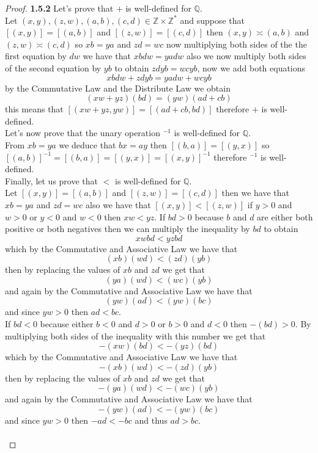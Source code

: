 \documentclass[11pt]{article}
\newcommand{\Z}{\mathbb{Z}}
\newcommand{\Q}{\mathbb{Q}}
\theoremstyle{definition}
\begin{document}
    \begin{proof}{\textbf{1.5.2}}
        Let's prove that $+$ is well-defined for $\Q$.\\
        Let $(x,y),(z,w),(a,b),(c,d) \in \Z \times \Z^*$ and suppose that $[(x,y)] = [(a,b)]$
        and $[(z,w)]=[(c,d)]$ then $(x,y)\asymp(a,b)$ and $(z,w)\asymp(c,d)$ so $xb=ya$
        and $zd=wc$ now multiplying both sides of the the first equation by $dw$ we have
        that $xbdw=yadw$ also we now multiply both sides of the second equation by $yb$
        to obtain $zdyb=wcyb$, now we add both equations
        $$xbdw+zdyb=yadw+wcyb$$
        by the Commutative Law and the Distribute Law we obtain
        $$(xw+yz)(bd)=(yw)(ad+cb)$$
        this means that $[(xw+yz,yw)]=[(ad+cb, bd)]$ therefore $+$ is well-defined.\\
        Let's now prove that the unary operation $^{-1}$ is well-defined for $\Q$.\\
        From $xb=ya$ we deduce that $bx=ay$ then $[(b,a)]=[(y,x)]$ so
        $[(a,b)]^{-1}=[(b,a)]=[(y,x)]=[(x,y)]^{-1}$ therefore $^{-1}$ is well-defined.\\
        Finally, let us prove that $<$ is well-defined for $\Q$.\\
        Let $[(x,y)]=[(a,b)]$ and $[(z,w)]=[(c,d)]$ then we have that $xb=ya$ and $zd=wc$
        also we have that $[(x,y)]<[(z,w)]$ if $y>0$ and $w>0$ or $y<0$ and $w<0$ then
        $xw<yz$. If $bd > 0$ because $b$ and $d$ are either both positive or
        both negatives then we can multiply the inequality by $bd$ to obtain
        $$xwbd<yzbd$$
        which by the Commutative and Associative Law we have that
        $$(xb)(wd)<(zd)(yb)$$
        then by replacing the values of $xb$ and $zd$ we get that
        $$(ya)(wd)<(wc)(yb)$$
        and again by the Commutative and Associative Law we have that
        $$(yw)(ad)<(yw)(bc)$$
        and since $yw>0$ then $ad<bc$.\\
        If $bd<0$ because either $b<0$ and $d>0$ or $b>0$ and $d<0$ then $-(bd)>0$.
        By multiplying both sides of the inequality with this number we get that 
        $$-(xw)(bd)<-(yz)(bd)$$
        which by the Commutative and Associative Law we have that
        $$-(xb)(wd)<-(zd)(yb)$$
        then by replacing the values of $xb$ and $zd$ we get that
        $$-(ya)(wd)<-(wc)(yb)$$
        and again by the Commutative and Associative Law we have that
        $$-(yw)(ad)<-(yw)(bc)$$
        and since $yw>0$ then $-ad<-bc$ and thus $ad>bc$.\\\\

\end{proof}
\end{document}
